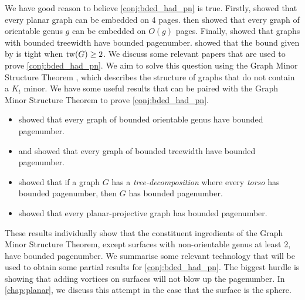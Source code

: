 We have good reason to believe \cref{conj:bded_had_pn} is true. Firstly, \textcite{yannakakisEmbeddingPlanarGraphs1989} showed that every planar graph can be embedded on 4 pages. \textcite{heathPagenumberGenusGraphs1992} then showed that every graph of orientable genus $g$ can be embedded on $O(g)$ pages. Finally, \textcite{ganleyPagenumberTrees2001} showed that graphs with bounded treewidth have bounded pagenumber. \textcite{dujmovicGraphTreewidthGeometric2007} showed that the bound given by \citeauthor{ganleyPagenumberTrees2001} is tight when $\operatorname{tw}(G) \geq 2$.
We discuss some relevant papers that are used to prove \cref{conj:bded_had_pn}.
We aim to solve this question using the Graph Minor Structure Theorem \cite{robertsonGraphMinorsXVI2003}, which describes the structure of graphs that do not contain a \(K_t\) minor. 
We have some useful results that can be paired with the Graph Minor Structure Theorem to prove \cref{conj:bded_had_pn}.
\begin{itemize}
	\item \textcite{heathPagenumberGenusGraphs1992} showed that every graph of bounded orientable genus have bounded pagenumber.
	\item \textcite{ganleyPagenumberTrees2001} and \textcite{dujmovicGraphTreewidthGeometric2007} showed that every graph of bounded treewidth have bounded pagenumber.
	\item \textcite{hickingbothamStackNumberCliqueSum2023} showed that if a graph \(G\) has a \textit{tree-decomposition} where every \textit{torso} has bounded pagenumber, then \(G\) has bounded pagenumber.
	\item \textcite{nakamotoBookEmbeddingProjectiveplanar2015} showed that every planar-projective graph has bounded pagenumber.
\end{itemize}
These results individually show that the constituent ingredients of the Graph Minor Structure Theorem, except surfaces with non-orientable genus at least 2, have bounded pagenumber. We summarise some relevant technology that will be used to obtain some partial results for \cref{conj:bded_had_pn}. 
The biggest hurdle is showing that adding vortices on surfaces will not blow up the pagenumber. In \cref{chap:planar}, we discuss this attempt in the case that the surface is the sphere. 